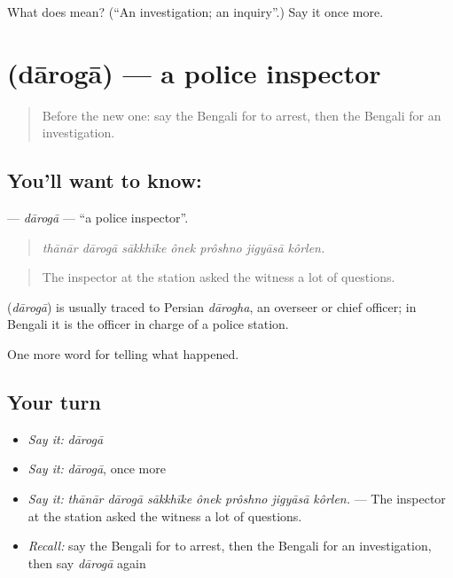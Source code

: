 \begin{tcolorbox}[breakable,colback=teal!4,colframe=teal!35!black,title={Before you move on}]
What does  mean? (\textquotedblleft{}An investigation; an inquiry\textquotedblright{}.) Say it once more.
\end{tcolorbox}
\section[\texorpdfstring{\bn{দারোগা} (dārogā)}{দারোগা (dārogā)}]{ (dārogā) — a police inspector}

\label{lesson:BN-C283-daroga}



\begin{quote}
Before the new one: say the Bengali for to arrest, then the Bengali for an investigation.
\end{quote}

\subsection*{You'll want to know: }
\textbf{} — \emph{dārogā} — \textquotedblleft{}a police inspector\textquotedblright{}.

\begin{quote}
      
\end{quote}

\begin{quote}
\emph{thānār dārogā sākkhīke ônek prôshno jigyāsā kôrlen.}
\end{quote}

\begin{quote}
The inspector at the station asked the witness a lot of questions.
\end{quote}

\begin{cousinweb}
\textbf{} (\emph{dārogā}) is usually traced to Persian \emph{dārogha}, an overseer or chief officer; in Bengali it is the officer in charge of a police station.
\end{cousinweb}

\begin{grammarlens}[title={What you've built}]
One more word for telling what happened.
\end{grammarlens}

\subsection*{Your turn}
\begin{itemize}
\raggedright
  \item \emph{Say it:} \emph{dārogā}
  \item \emph{Say it:} \emph{dārogā}, once more
  \item \emph{Say it:} \emph{thānār dārogā sākkhīke ônek prôshno jigyāsā kôrlen.} — The inspector at the station asked the witness a lot of questions.
  \item \emph{Recall:} say the Bengali for to arrest, then the Bengali for an investigation, then say \emph{dārogā} again
\end{itemize}

